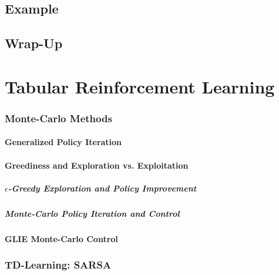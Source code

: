 	\section{Example} %

	\section{Wrap-Up} %

\chapter{Tabular Reinforcement Learning} %

		\subsection{Monte-Carlo Methods} %

			\subsubsection{Generalized Policy Iteration} %

			\subsubsection{Greediness and Exploration vs. Exploitation} %

				\paragraph{\(\epsilon\)-Greedy Exploration and Policy Improvement} %

				\paragraph{Monte-Carlo Policy Iteration and Control} %

			\subsubsection{GLIE Monte-Carlo Control} %

		\subsection{TD-Learning: SARSA} %

